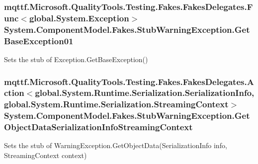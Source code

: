 \hypertarget{class_system_1_1_component_model_1_1_fakes_1_1_stub_warning_exception_aa1c930c36b897743c32580ca40976a59}{
\subsubsection[{Get\-Base\-Exception01}]{\setlength{\rightskip}{0pt plus 5cm}mqttf.\-Microsoft.\-Quality\-Tools.\-Testing.\-Fakes.\-Fakes\-Delegates.\-Func$<$global.\-System.\-Exception$>$ System.\-Component\-Model.\-Fakes.\-Stub\-Warning\-Exception.\-Get\-Base\-Exception01}}\label{class_system_1_1_component_model_1_1_fakes_1_1_stub_warning_exception_aa1c930c36b897743c32580ca40976a59}


Sets the stub of Exception.\-Get\-Base\-Exception()

\hypertarget{class_system_1_1_component_model_1_1_fakes_1_1_stub_warning_exception_a6a9d632f7f4c3968c7fa9be3d640a6ab}{
\subsubsection[{Get\-Object\-Data\-Serialization\-Info\-Streaming\-Context}]{\setlength{\rightskip}{0pt plus 5cm}mqttf.\-Microsoft.\-Quality\-Tools.\-Testing.\-Fakes.\-Fakes\-Delegates.\-Action$<$global.\-System.\-Runtime.\-Serialization.\-Serialization\-Info, global.\-System.\-Runtime.\-Serialization.\-Streaming\-Context$>$ System.\-Component\-Model.\-Fakes.\-Stub\-Warning\-Exception.\-Get\-Object\-Data\-Serialization\-Info\-Streaming\-Context}}\label{class_system_1_1_component_model_1_1_fakes_1_1_stub_warning_exception_a6a9d632f7f4c3968c7fa9be3d640a6ab}


Sets the stub of Warning\-Exception.\-Get\-Object\-Data(\-Serialization\-Info info, Streaming\-Context context)

